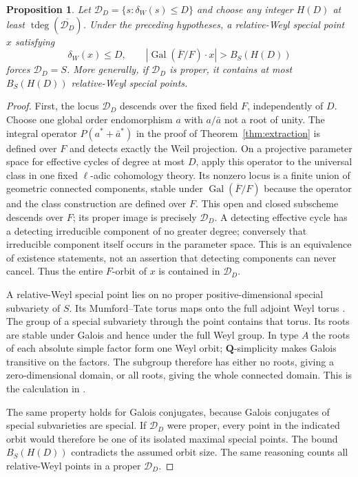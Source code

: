 \documentclass[11pt]{article}
\newtheorem{proposition}[theorem]{Proposition}
\theoremstyle{definition}
\theoremstyle{remark}
\newcommand{\Q}{\mathbf Q}
\begin{document}
\begin{proposition}\label{prop:galois-witness}
Let $\mathcal D_D=\{s:\delta_W(s)\leq D\}$ and choose any integer $H(D)$ at least $\operatorname{tdeg}(\overline{\mathcal D_D})$. Under the preceding hypotheses, a relative-Weyl special point $x$ satisfying
\[
 \delta_W(x)\leq D,\qquad
 |\operatorname{Gal}(\overline F/F)\cdot x|>B_S(H(D))
\]
forces $\mathcal D_D=S$. More generally, if $\mathcal D_D$ is proper, it contains at most $B_S(H(D))$ relative-Weyl special points.
\end{proposition}

\begin{proof}
First, the locus $\mathcal D_D$ descends over the fixed field $F$, independently of $D$. Choose one global order endomorphism $a$ with $a/\bar a$ not a root of unity. The integral operator $P(a^*+\bar a^*)$ in the proof of Theorem~\ref{thm:extraction} is defined over $F$ and detects exactly the Weil projection. On a projective parameter space for effective cycles of degree at most $D$, apply this operator to the universal class in one fixed $\ell$-adic cohomology theory. Its nonzero locus is a finite union of geometric connected components, stable under $\operatorname{Gal}(\overline F/F)$ because the operator and the class construction are defined over $F$. This open and closed subscheme descends over $F$; its proper image is precisely $\mathcal D_D$. A detecting effective cycle has a detecting irreducible component of no greater degree; conversely that irreducible component itself occurs in the parameter space. This is an equivalence of existence statements, not an assertion that detecting components can never cancel. Thus the entire $F$-orbit of $x$ is contained in $\mathcal D_D$.

A relative-Weyl special point lies on no proper positive-dimensional special subvariety of $S$. Its Mumford--Tate torus maps onto the full adjoint Weyl torus \cite[Remark~5.8]{ChaiOort}. The group of a special subvariety through the point contains that torus. Its roots are stable under Galois and hence under the full Weyl group. In type $A$ the roots of each absolute simple factor form one Weyl orbit; $\Q$-simplicity makes Galois transitive on the factors. The subgroup therefore has either no roots, giving a zero-dimensional domain, or all roots, giving the whole connected domain. This is the calculation in \cite[Lemma~6.3]{ChaiOort}.

The same property holds for Galois conjugates, because Galois conjugates of special subvarieties are special. If $\mathcal D_D$ were proper, every point in the indicated orbit would therefore be one of its isolated maximal special points. The bound $B_S(H(D))$ contradicts the assumed orbit size. The same reasoning counts all relative-Weyl points in a proper $\mathcal D_D$.
\end{proof}
\end{document}

